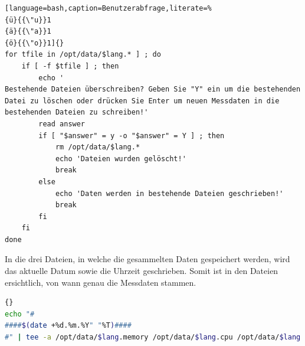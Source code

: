 \documentclass{fancydocument}
\begin{document}
\noindent
\begin{minipage}{\textwidth}
\begin{lstlisting}[language=bash,caption=Benutzerabfrage,literate=% 
{ü}{{\"u}}1 
{ä}{{\"a}}1 
{ö}{{\"o}}1]{}
for tfile in /opt/data/$lang.* ] ; do
	if [ -f $tfile ] ; then
		echo '
Bestehende Dateien überschreiben? Geben Sie "Y" ein um die bestehenden Datei zu löschen oder drücken Sie Enter um neuen Messdaten in die bestehenden Dateien zu schreiben!'
		read answer
		if [ "$answer" = y -o "$answer" = Y ] ; then
			rm /opt/data/$lang.*
			echo 'Dateien wurden gelöscht!'
			break
		else
			echo 'Daten werden in bestehende Dateien geschrieben!'
			break		
		fi			
	fi
done
\end{lstlisting}
\end{minipage}

In die drei Dateien, in welche die gesammelten Daten gespeichert werden, wird das aktuelle Datum sowie die Uhrzeit geschrieben. Somit ist in den Dateien ersichtlich, von wann genau die Messdaten stammen.

\noindent
\begin{minipage}{\textwidth}
\begin{lstlisting}[language=bash,caption=Titel einfügen]{}
echo "#
####$(date +%d.%m.%Y" "%T)####
#" | tee -a /opt/data/$lang.memory /opt/data/$lang.cpu /opt/data/$lang.time > /dev/null
\end{lstlisting}
\end{minipage}
\end{document}
